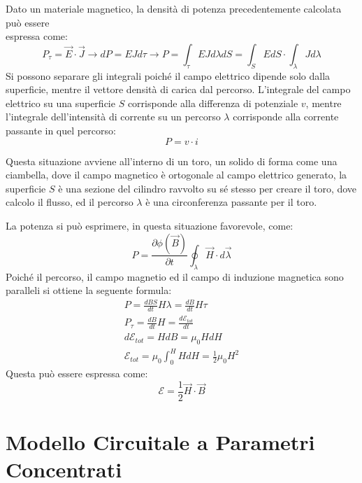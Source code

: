 \documentclass{article}
\numberwithin{equation}{subsection}
\begin{document}
Dato un materiale magnetico, la densità di potenza precedentemente calcolata può essere\\espressa come:
\begin{equation*}
    P_\tau=\vec{E}\cdot\vec{J}\to dP=EJd\tau\to P=\displaystyle\int_{\tau}EJd\lambda dS=\int_{S}EdS\cdot\int_{\lambda}Jd\lambda
\end{equation*}
Si possono separare gli integrali poiché il campo elettrico dipende solo dalla superficie, mentre il vettore densità di carica dal percorso. L'integrale del campo elettrico 
su una superficie $S$ corrisponde alla differenza di potenziale $v$, mentre l'integrale dell'intensità di corrente su un percorso $\lambda$ corrisponde alla corrente passante 
in quel percorso: 
\begin{equation}
    P=v\cdot i
\end{equation}

Questa situazione avviene all'interno di un toro, un solido di forma come una ciambella, dove il campo magnetico è ortogonale al campo elettrico generato, la superficie $S$ 
è una sezione del cilindro ravvolto su sé stesso per creare il toro, dove calcolo il flusso, ed il percorso $\lambda$ è una circonferenza passante per il toro. 

La potenza si può esprimere, in questa situazione favorevole, come:
\begin{equation*}
    P=\displaystyle\frac{\partial \phi(\vec{B})}{\partial t}\oint_{\lambda}\vec{H}\cdot d\vec{\lambda}
\end{equation*}
Poiché il percorso, il campo magnetio ed il campo di induzione magnetica sono paralleli si ottiene la seguente formula:
\begin{gather*}
    P=\displaystyle\frac{dBS}{dt}H\lambda=\frac{dB}{dt}H\tau\\
    P_{\tau}=\displaystyle\frac{dB}{dt}H=\frac{d\mathscr{E}_{tot}}{dt}\\
    d\mathscr{E}_{tot}=HdB=\mu_0HdH\\
    \mathscr{E}_{tot}=\displaystyle\mu_0\int_0^HHdH=\frac{1}{2}\mu_0H^2
\end{gather*}
Questa può essere espressa come:
\begin{equation}
    \mathscr{E}=\displaystyle\frac{1}{2}\vec{H}\cdot\vec{B}
\end{equation}

\clearpage

\section{Modello Circuitale a Parametri Concentrati}
\end{document}
